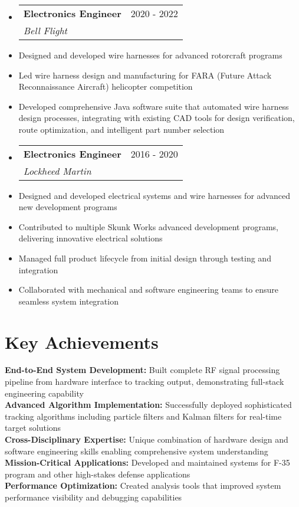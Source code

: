 \documentclass[11pt,a4paper]{article}
\makeatletter
\newcommand{\resumeItem}[1]{
  \item\small{#1}
}
\newcommand{\resumeSubheading}[4]{
  \vspace{-2pt}\item
    \begin{tabular*}{0.97\textwidth}[t]{l@{\extracolsep{\fill}}r}
      \textbf{#1} & #2 \\
      \textit{\small#3} & \textit{\small #4} \\
    \end{tabular*}\vspace{-7pt}
}
\makeatother
\begin{document}
\begin{itemize}[leftmargin=0.15in, label={}]
    \resumeSubheading
        {Electronics Engineer}{2020 - 2022}
        {Bell Flight}{}
        \resumeItemListStart
            \resumeItem{Designed and developed wire harnesses for advanced rotorcraft programs}
            \resumeItem{Led wire harness design and manufacturing for FARA (Future Attack Reconnaissance Aircraft) helicopter competition}
            \resumeItem{Developed comprehensive Java software suite that automated wire harness design processes, integrating with existing CAD tools for design verification, route optimization, and intelligent part number selection}
        \resumeItemListEnd
    \resumeSubheading
        {Electronics Engineer}{2016 - 2020}
        {Lockheed Martin}{}
        \resumeItemListStart
            \resumeItem{Designed and developed electrical systems and wire harnesses for advanced new development programs}
            \resumeItem{Contributed to multiple Skunk Works advanced development programs, delivering innovative electrical solutions}
            \resumeItem{Managed full product lifecycle from initial design through testing and integration}
            \resumeItem{Collaborated with mechanical and software engineering teams to ensure seamless system integration}
        \resumeItemListEnd
\end{itemize}

\section{Key Achievements}
\begin{itemize}[leftmargin=0.15in, label={}]
    \small{\item{
        \textbf{End-to-End System Development:} Built complete RF signal processing pipeline from hardware interface to tracking output, demonstrating full-stack engineering capability \\
        \textbf{Advanced Algorithm Implementation:} Successfully deployed sophisticated tracking algorithms including particle filters and Kalman filters for real-time target solutions \\
        \textbf{Cross-Disciplinary Expertise:} Unique combination of hardware design and software engineering skills enabling comprehensive system understanding \\
        \textbf{Mission-Critical Applications:} Developed and maintained systems for F-35 program and other high-stakes defense applications \\
        \textbf{Performance Optimization:} Created analysis tools that improved system performance visibility and debugging capabilities
    }}
\end{itemize}
\end{document}
